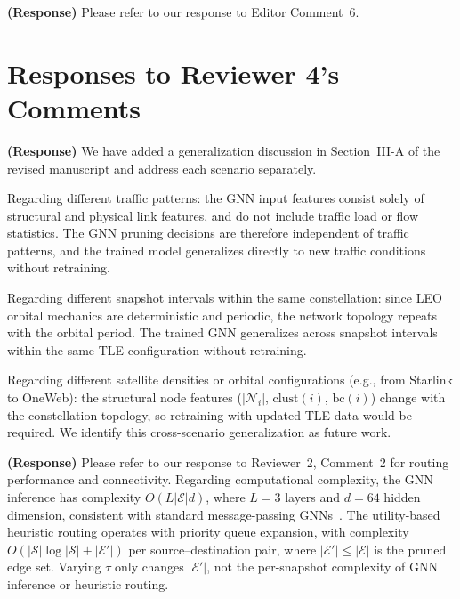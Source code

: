 \documentclass[letter]{article}
\begin{document}
\vspace{10mm}
\noindent {}

\vspace{5mm}
{\bf (Response)}
Please refer to our response to Editor Comment~6.

\newpage
\vspace{0.1cm} \noindent
\section*{\large Responses to Reviewer 4's Comments}

\noindent {}

\vspace{5mm}
{\bf (Response)}
We have added a generalization discussion in Section~III-A of the revised manuscript and address each scenario separately.

Regarding different traffic patterns: the GNN input features consist solely of structural and physical link features, and do not include traffic load or flow statistics. The GNN pruning decisions are therefore independent of traffic patterns, and the trained model generalizes directly to new traffic conditions without retraining.

Regarding different snapshot intervals within the same constellation: since LEO orbital mechanics are deterministic and periodic, the network topology repeats with the orbital period. The trained GNN generalizes across snapshot intervals within the same TLE configuration without retraining.

Regarding different satellite densities or orbital configurations (e.g., from Starlink to OneWeb): the structural node features ($|\mathcal{N}_i|$, $\mathrm{clust}(i)$, $\mathrm{bc}(i)$) change with the constellation topology, so retraining with updated TLE data would be required. We identify this cross-scenario generalization as future work.

\vspace{10mm}
\noindent {}

\vspace{5mm}
{\bf (Response)}
Please refer to our response to Reviewer~2, Comment~2 for routing performance and connectivity. Regarding computational complexity, the GNN inference has complexity $O(L|\mathcal{E}|d)$, where $L=3$ layers and $d=64$ hidden dimension, consistent with standard message-passing GNNs~\cite{rao2025dynamic}. The utility-based heuristic routing operates with priority queue expansion, with complexity $O(|\mathcal{S}|\log|\mathcal{S}| + |\mathcal{E}'|)$ per source--destination pair, where $|\mathcal{E}'| \leq |\mathcal{E}|$ is the pruned edge set. Varying $\tau$ only changes $|\mathcal{E}'|$, not the per-snapshot complexity of GNN inference or heuristic routing.
\end{document}
